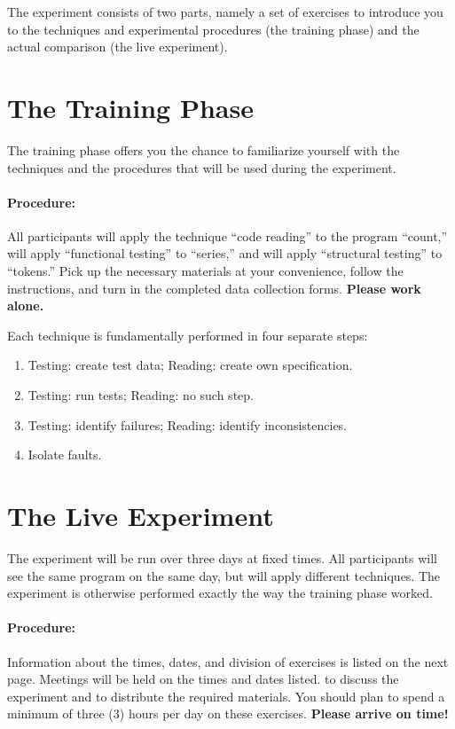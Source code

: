 The experiment consists of two parts, namely a set of exercises to
introduce you to the techniques and experimental procedures (the
training phase) and the actual comparison (the live experiment).

\section*{The Training Phase}

The training phase offers you the chance to familiarize yourself
with the techniques and the procedures that will be used during the
experiment.

\paragraph{Procedure:}
All participants will apply the technique ``code reading'' to the
program ``count,'' will apply ``functional testing'' to ``series,''
and will apply  ``structural testing'' to ``tokens.''
Pick up the necessary materials at your convenience, follow the
instructions, and turn in the completed data collection forms.
{\bf Please work alone.}

\medskip

Each technique is fundamentally performed in four separate steps:
\begin{enumerate}
	\item Testing: create test data; Reading: create own specification.
	\item Testing: run tests; Reading: no such step.
	\item Testing: identify failures; Reading: identify inconsistencies.
	\item Isolate faults.
\end{enumerate}


\section*{The Live Experiment}

The experiment will be run over three days at fixed times.
All participants will see the same program on the same day,
but will apply different techniques.
The experiment is otherwise performed exactly the way the training
phase worked.


\paragraph{Procedure:} 
Information about the times, dates, and division of exercises is
listed on the next page.
Meetings will be held on the times and dates listed. to discuss the
experiment and to distribute the required materials.
You should plan to spend a minimum of three (3) hours per day on these
exercises.
{\bf Please arrive on time!}


